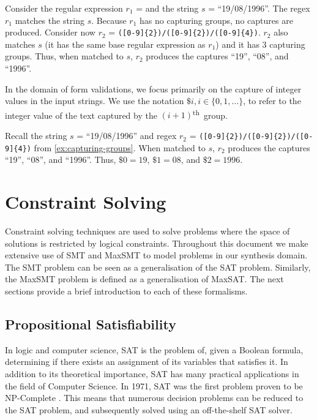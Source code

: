 \begin{example}\label{ex:capturing-groups}
Consider the regular expression \(r_1\) =  and the string \(s\) = ``19/08/1996''. The regex \(r_1\) matches the string \(s\). Because \(r_1\) has no capturing groups, no captures are produced.
%
Consider now \(r_2\) = \verb`([0-9]{2})/([0-9]{2})/([0-9]{4})`. \(r_2\) also matches \(s\) (it has the same base regular expression as \(r_1\)) and it has 3 capturing groups. Thus, when matched to \(s\), \(r_2\) produces the captures ``19'', ``08'', and ``1996''.
\end{example}

\noindent
In the domain of form validations, we focus primarily on the capture of integer values in the input strings. We use the notation \(\$i, i \in \{0, 1, ...\}\), to refer to the integer value of the text captured by the \((i+1)\)\textsuperscript{th}~group.

\begin{example}
Recall the string \(s\) = ``19/08/1996'' and regex \(r_2\) = \verb`([0-9]{2})/([0-9]{2})/([0-9]{4})` from \autoref{ex:capturing-groups}. When matched to \(s\), \(r_2\) produces the captures ``19'', ``08'', and ``1996''. Thus, \(\$0 = 19\), \(\$1 = 08\), and \(\$2 = 1996\).
\end{example}

\section{Constraint Solving}\label{sec:logic}
Constraint solving techniques are used to solve problems where the space of solutions is restricted by logical constraints.
Throughout this document we make extensive use of \acf{SMT} and \acf{MaxSMT} to model problems in our synthesis domain.
%
The \ac{SMT} problem can be seen as a generalisation of the \ac{SAT} problem. Similarly, the \ac{MaxSMT} problem is defined as a generalisation of \ac{MaxSAT}. The next sections provide a brief introduction to each of these formalisms.

\subsection{Propositional Satisfiability}

In logic and computer science, \ac{SAT} is the problem of, given a Boolean formula, determining if there exists an assignment of its variables that satisfies it.
%
In addition to its theoretical importance, \ac{SAT} has many practical applications in the field of Computer Science. In 1971, \ac{SAT} was the first problem proven to be NP-Complete \cite{DBLP:conf/stoc/Cook71}. This means that numerous decision problems can be reduced to the \ac{SAT} problem, and subsequently solved using an off-the-shelf \ac{SAT} solver.

